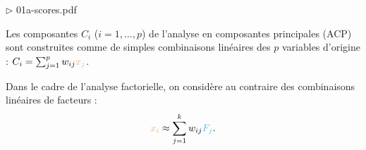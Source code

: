 \foilhead{}

{\centering {}\par}


\hfill $\triangleright$ 01a-scores.pdf

Les composantes $C_i$ ($i=1,\dots,p$) de l'analyse en composantes principales
(ACP) sont construites comme de simples combinaisons linéaires des $p$ variables
d'origine : $C_i=\sum_{j=1}^pw_{ij}\textcolor{Apricot}{x_j}$.

Dans le cadre de l'analyse factorielle, on considère au contraire des
combinaisons linéaires de facteurs\autocite[chap.~ 6]{revelle16} :
\[
\textcolor{Apricot}{x_i}\approx\sum_{j=1}^kw_{ij}\textcolor{CornflowerBlue}{F_j}.
\]



